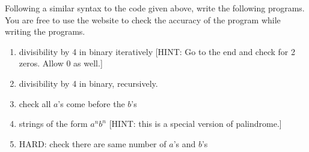 \documentclass[answers]{exam}
\begin{document}
    Following a similar syntax to the code given above, write the following programs. You are free to use the website to check the accuracy of the program while writing the programs.
    \begin{enumerate}
        \item divisibility by 4 in binary iteratively [HINT: Go to the end and check for 2 zeros. Allow 0 as well.]
        \begin{solution}
            \vspace*{520pt}
        \end{solution}
        
        \item divisibility by 4 in binary, recursively.
        \begin{solution}
            \vspace*{570pt}
        \end{solution}
        
        \item check all $a$'s come before the $b$'s
        \begin{solution}
            \vspace*{570pt}
        \end{solution}
        
        \item strings of the form $a^n b^n$ [HINT: this is a special version of palindrome.]
        \begin{solution}
            \vspace*{570pt}
        \end{solution}

        \item HARD: check there are same number of $a$'s and $b$'s
        \begin{solution}
            \vspace*{560pt}
        \end{solution}
    \end{enumerate}
    
    
\end{document}
